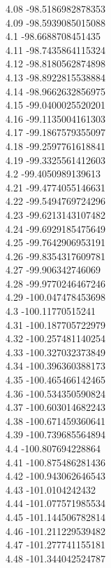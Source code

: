 {4.08	-98.5186982878353\\
4.09	-98.5939085015088\\
4.1	-98.6688708451435\\
4.11	-98.7435864115324\\
4.12	-98.8180562874898\\
4.13	-98.8922815538884\\
4.14	-98.9662632856975\\
4.15	-99.0400025520201\\
4.16	-99.1135004161303\\
4.17	-99.1867579355097\\
4.18	-99.2597761618841\\
4.19	-99.3325561412603\\
4.2	-99.4050989139613\\
4.21	-99.4774055146631\\
4.22	-99.5494769724296\\
4.23	-99.6213143107482\\
4.24	-99.6929185475649\\
4.25	-99.7642906953191\\
4.26	-99.8354317609781\\
4.27	-99.906342746069\\
4.28	-99.9770246467246\\
4.29	-100.047478453698\\
4.3	-100.11770515241\\
4.31	-100.187705722979\\
4.32	-100.257481140254\\
4.33	-100.327032373849\\
4.34	-100.396360388173\\
4.35	-100.465466142465\\
4.36	-100.534350590824\\
4.37	-100.603014682243\\
4.38	-100.671459360641\\
4.39	-100.739685564894\\
4.4	-100.807694228864\\
4.41	-100.875486281436\\
4.42	-100.943062646543\\
4.43	-101.0104242432\\
4.44	-101.077571985534\\
4.45	-101.144506782814\\
4.46	-101.211229539482\\
4.47	-101.277741155181\\
4.48	-101.344042524787\\
}
